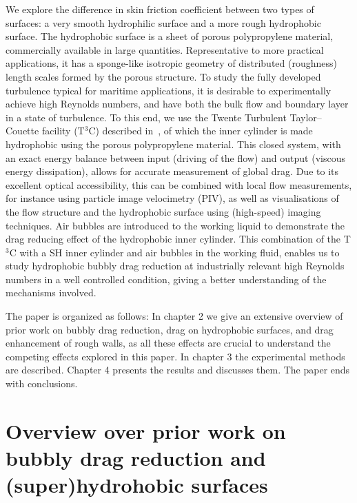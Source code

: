 We explore the difference in skin friction coefficient between two types of surfaces: a very smooth hydrophilic surface and a more rough {hydrophobic} surface. The {hydrophobic} surface is a sheet of porous polypropylene material, commercially available in large quantities. Representative to more practical applications, it has a sponge-like isotropic geometry of distributed (roughness) length scales formed by the porous structure. To study the fully developed turbulence typical for maritime applications, it is desirable to experimentally achieve high Reynolds numbers, and have both the bulk flow and boundary layer in a state of turbulence. To this end, we use the Twente Turbulent Taylor--Couette facility (T$^3$C) described in~\citet{VanGils2011}, of which the inner cylinder is made {hydrophobic} using the porous polypropylene material. This closed system, with an exact energy balance between input (driving of the flow) and output (viscous energy dissipation), allows for accurate measurement of global drag. Due to its excellent optical accessibility, this can be combined with local flow measurements, for instance using particle image velocimetry (PIV), as well as visualisations of the flow structure and the {hydrophobic} surface using (high-speed) imaging techniques. Air bubbles are introduced to the working liquid to demonstrate the drag reducing effect of the {hydrophobic} inner cylinder. This combination of the T$^3$C with a SH inner cylinder and air bubbles in the working fluid, enables us to study {hydrophobic} bubbly drag reduction at industrially relevant high Reynolds numbers in a well controlled condition, giving a better understanding of the mechanisms involved.

The paper is organized as follows: In chapter 2 we give an extensive overview of prior work on bubbly drag reduction, drag on {hydrophobic} surfaces, and drag enhancement of rough walls, as all these effects are crucial to understand the competing effects explored in this paper. In chapter 3 the experimental methods are described. Chapter 4 presents the results and discusses them. The paper ends with conclusions.

\section{Overview over prior work on bubbly drag reduction and (super)hydrohobic surfaces}

